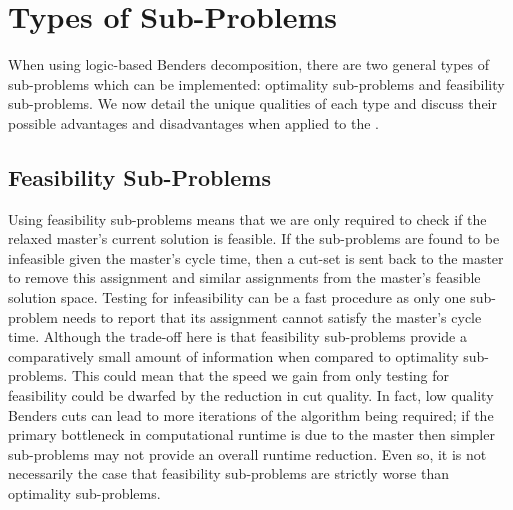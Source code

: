 \section{Types of Sub-Problems}
\label{sec:bend:SPtype}
When using logic-based Benders decomposition, there are two general types 
of sub-problems which can be implemented: optimality sub-problems and 
feasibility sub-problems.
We now detail the unique qualities of each 
type and discuss their possible advantages and disadvantages when 
applied to the .

\subsection{Feasibility Sub-Problems}
\label{sec:bend:SPfeas}
Using feasibility sub-problems means that we are only required to check if 
the relaxed master's current solution is feasible.
If the sub-problems are found to be infeasible given the master's cycle time, 
then a cut-set is sent back to the master to remove
this assignment and similar assignments from the master's feasible solution space.
Testing for infeasibility can be a fast procedure as only
one sub-problem needs to report that its assignment cannot
satisfy the master's cycle time.
Although the trade-off here is that feasibility sub-problems
provide a comparatively small amount of information when compared to optimality sub-problems.
This could mean that the speed we gain from only testing for
feasibility could be dwarfed by the reduction in cut quality.
In fact, low quality Benders cuts can lead to more iterations of
the algorithm being required; if the primary bottleneck in computational runtime
is due to the master then simpler sub-problems may not
provide an overall runtime reduction.
Even so, it is not necessarily the case that feasibility sub-problems 
are strictly worse than optimality sub-problems.


